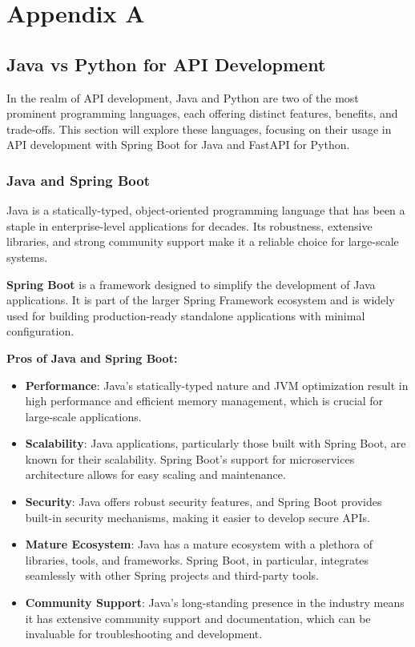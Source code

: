 \chapter{Appendix A}
\section{Java vs Python for API Development}
\label{sec:java-vs-python}

In the realm of API development, Java and Python are two of the most prominent programming languages, each offering distinct features, benefits, and trade-offs. This section will explore these languages, focusing on their usage in API development with Spring Boot for Java and FastAPI for Python.

\subsection{Java and Spring Boot}

Java is a statically-typed, object-oriented programming language that has been a staple in enterprise-level applications for decades. Its robustness, extensive libraries, and strong community support make it a reliable choice for large-scale systems.

\textbf{Spring Boot} is a framework designed to simplify the development of Java applications. It is part of the larger Spring Framework ecosystem and is widely used for building production-ready standalone applications with minimal configuration.

\textbf{Pros of Java and Spring Boot:}
\begin{itemize}
    \item \textbf{Performance}: Java's statically-typed nature and JVM optimization result in high performance and efficient memory management, which is crucial for large-scale applications.
    \item \textbf{Scalability}: Java applications, particularly those built with Spring Boot, are known for their scalability. Spring Boot's support for microservices architecture allows for easy scaling and maintenance.
    \item \textbf{Security}: Java offers robust security features, and Spring Boot provides built-in security mechanisms, making it easier to develop secure APIs.
    \item \textbf{Mature Ecosystem}: Java has a mature ecosystem with a plethora of libraries, tools, and frameworks. Spring Boot, in particular, integrates seamlessly with other Spring projects and third-party tools.
    \item \textbf{Community Support}: Java's long-standing presence in the industry means it has extensive community support and documentation, which can be invaluable for troubleshooting and development.
\end{itemize}

